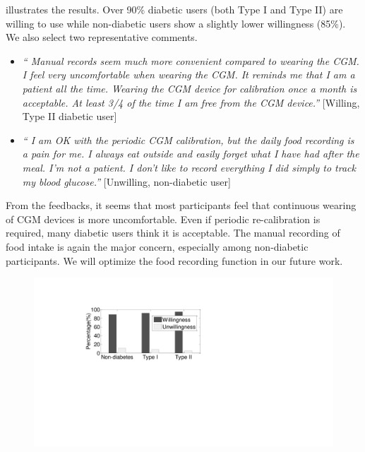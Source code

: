{ illustrates the results.
Over 90\% diabetic users (both Type I and Type II) are willing to use \sysname while non-diabetic users show a slightly lower willingness (85\%).
We also select two representative comments.
\begin{itemize}
  \item
  \textit{``
  Manual records seem much more convenient compared to wearing the CGM.
  I feel very uncomfortable when wearing the CGM.
  It reminds me that I am a patient all the time.
  Wearing the CGM device for calibration once a month is acceptable.
  At least 3/4 of the time I am free from the CGM device.''}
  [Willing, Type II diabetic user]
  \item
  \textit{``
  I am OK with the periodic CGM calibration, but the daily food recording is a pain for me.
  I always eat outside and easily forget what I have had after the meal.
  I'm not a patient.
  I don't like to record everything I did simply to track my blood glucose.''}
  [Unwilling, non-diabetic user]
\end{itemize}
From the feedbacks, it seems that most participants feel that continuous wearing of CGM devices is more uncomfortable.
Even if periodic re-calibration is required, many diabetic users think it is acceptable.
The manual recording of food intake is again the major concern, especially among non-diabetic participants. We will optimize the food recording function in our future work.

\begin{figure}[h]
  \centering
  \includegraphics[width=0.4\columnwidth]{./img/willingness.pdf}
  \caption{}
  \label{fig:user_willingness}
\end{figure}


}

